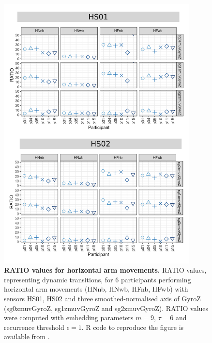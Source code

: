 \begin{figure}[!h]
\centering
\includegraphics[width=0.9\textwidth]{rqa_ratio_H_w500}
    \caption{
	{\bf RATIO values for horizontal arm movements.}	
	RATIO values, representing dynamic transitions, 
	for 6 participants performing horizontal arm movements 
	(HNnb, HNwb, HFnb, HFwb)
	with sensors HS01, HS02 and three smoothed-normalised axis 
	of GyroZ (sg0zmuvGyroZ, sg1zmuvGyroZ and sg2zmuvGyroZ).
	RATIO values were computed with 
	embedding parameters $m=9$, $\tau=6$ and recurrence threshold
	$\epsilon=1$.
	R code to reproduce the figure is available from \cite{hwum2018}.
        }
    \label{fig:rqa_ratio_H}
\end{figure}
